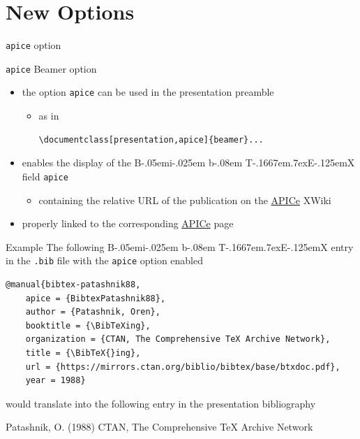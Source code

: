 \documentclass[presentation,\almamaterseal,apice]{beamer}\mode<presentation>{\usetheme{\almamaterpreset}}
\def\BibTeX{{\rm B\kern-.05em{\sc i\kern-.025em b}\kern-.08em
    T\kern-.1667em\lower.7ex\hbox{E}\kern-.125emX}}
\begin{document}






\section{New Options}

\begin{frame}{\texttt{apice} option}
%
\begin{alertblock}{\texttt{apice} Beamer option}
\begin{itemize}
	\item the option \texttt{apice} can be used in the presentation preamble
	\begin{itemize}
		\item as in
		\begin{verbatim}
\documentclass[presentation,apice]{beamer}...
		\end{verbatim}
	\end{itemize}
	\item enables the display of the \BibTeX{} field \texttt{apice}
	\begin{itemize}
		\item containing the relative URL of the publication on the \alert{\href{https://apice.unibo.it/}{\textsf{APICe}}} XWiki
	\end{itemize}
	\item properly linked to the corresponding \href{https://apice.unibo.it/}{\textsf{APICe}} page
\end{itemize}
\end{alertblock}
%
\begin{exampleblock}{Example}
%
The following \BibTeX{} entry in the \texttt{.bib} file with the \texttt{apice} option enabled
%
{\tiny\begin{verbatim}
@manual{bibtex-patashnik88,
    apice = {BibtexPatashnik88},
    author = {Patashnik, Oren},
    booktitle = {\BibTeXing},
    organization = {CTAN, The Comprehensive TeX Archive Network},
    title = {\BibTeX{}ing},
    url = {https://mirrors.ctan.org/biblio/bibtex/base/btxdoc.pdf},
    year = 1988}
\end{verbatim}} %
%
would translate into the following entry in the presentation bibliography
%
\begin{thebibliography}{}
Patashnik, O. (1988)
\newblock {\bfseries {\em \BibTeX{}ing}}
\newblock CTAN, The Comprehensive TeX Archive Network
\newblock{} 
\end{thebibliography}
%
\end{exampleblock}
%
\end{frame}
\end{document}
